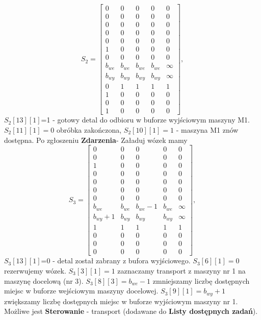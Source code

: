 \documentclass[10pt, a4paper]{article}
\begin{document}
\begin{itemize}
\begin{equation*}
S_2=\left[\begin{array}{ccccc}
0 & 0 & 0 & 0&0\\
0 & 0 & 0 & 0 & 0\\
0 & 0 & 0 & 0& 0\\
0 & 0 & 0 & 0& 0\\
0 & 0 & 0 & 0& 0\\
1 & 0 & 0 & 0 & 0\\
0 & 0 & 0 & 0& 0\\
b_{we}& b_{we}& b_{we}& b_{we} & \infty\\
b_{wy}& b_{wy}& b_{wy}& b_{wy} & \infty\\
0& 1& 1& 1 & 1\\
1 & 0 & 0 & 0 & 0\\
0 & 0 & 0 & 0 & 0\\
1 & 0 & 0 & 0 & 0
\end{array}\right],
\end{equation*}
$S_2[13][1]$=1 - gotowy detal do odbioru w buforze wyjściowym maszyny M1. $S_2[11][1]=0$ obróbka zakończona, $S_2[10][1]=1$ - maszyna M1 znów dostępna. Po zgłoszeniu \textbf{Zdarzenia}- Załaduj wózek mamy
\begin{equation*}
S_3=\left[\begin{array}{ccccc}
0 & 0 & 0 & 0&0\\
0 & 0 & 0 & 0 & 0\\
1 & 0 & 0 & 0& 0\\
0 & 0 & 0 & 0& 0\\
0 & 0 & 0 & 0& 0\\
0 & 0 & 0 & 0 & 0\\
0 & 0 & 0 & 0& 0\\
b_{we}& b_{we}& b_{we}-1& b_{we} & \infty\\
b_{wy}+1& b_{wy}& b_{wy}& b_{wy} & \infty\\
1& 1& 1& 1 & 1\\
0 & 0 & 0 & 0 & 0\\
0 & 0 & 0 & 0 & 0\\
0 & 0 & 0 & 0 & 0
\end{array}\right],
\end{equation*}
$S_3[13][1]$=0 - detal został zabrany z bufora wyjściowego. $S_3[6][1]=0$ rezerwujemy wózek. $S_3[3][1]=1$ zaznaczamy transport z maszyny nr 1 na maszynę docelową (nr 3). $S_3[8][3]=b_{we}-1$ zmniejszamy liczbę dostępnych miejsc w buforze wejściowym maszyny docelowej. $S_3[9][1]=b_{wy}+1$ zwiększamy liczbę dostępnych miejsc w buforze wyjściowym maszyny nr 1. Możliwe jest \textbf{Sterowanie} - transport (dodawane do \textbf{Listy dostępnych zadań}).

\end{itemize}
\end{document}
